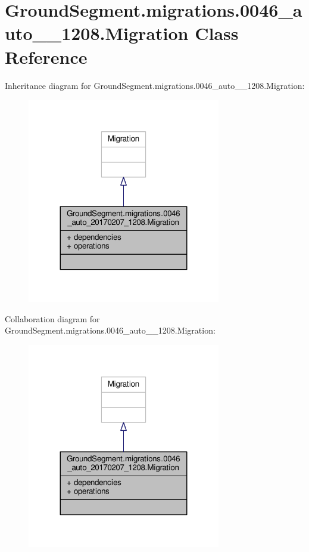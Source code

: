\hypertarget{class_ground_segment_1_1migrations_1_10046__auto__20170207__1208_1_1_migration}{}\section{Ground\+Segment.\+migrations.0046\+\_\+auto\+\_\+\_\+1208.Migration Class Reference}
\label{class_ground_segment_1_1migrations_1_10046__auto__20170207__1208_1_1_migration}


Inheritance diagram for Ground\+Segment.\+migrations.0046\+\_\+auto\+\_\+\_\+1208.Migration\+:\nopagebreak
\begin{figure}[H]
\begin{center}
\leavevmode
\includegraphics[width=239pt]{class_ground_segment_1_1migrations_1_10046__auto__20170207__1208_1_1_migration__inherit__graph}
\end{center}
\end{figure}


Collaboration diagram for Ground\+Segment.\+migrations.0046\+\_\+auto\+\_\+\_\+1208.Migration\+:\nopagebreak
\begin{figure}[H]
\begin{center}
\leavevmode
\includegraphics[width=239pt]{class_ground_segment_1_1migrations_1_10046__auto__20170207__1208_1_1_migration__coll__graph}
\end{center}
\end{figure}
